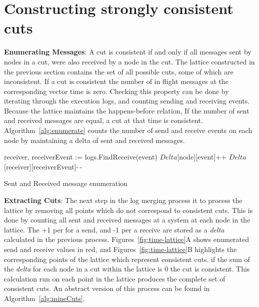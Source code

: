 \section{Constructing strongly consistent cuts}
\label{sec:consistent-cuts-appendix}

\textbf{Enumerating Messages}: A cut is consistent if and only if all
messages sent by nodes in a cut, were also received by a node in the
cut.  The lattice constructed in the previous section contains the set
of all possible cuts, some of which are inconsistent. If a cut is
consistent the number of in flight messages at the corresponding
vector time is zero. Checking this property can be done by iterating
through the execution logs, and counting sending and receiving events.
Because the lattice maintains the happens-before relation, If the
number of sent and received messages are equal, a cut at that time is
consistent.  Algorithm~\ref{alg:enumerate} counts the number of send
and receive events on each node by maintaining a delta of sent and
received messages.

\begin{algorithm}[t]
     {
         {
             {
                receiver, receiverEvent := logs.FindReceive(event)
                $Delta$[node][event]++
                $Delta$[receiver][receiverEvent]-\,-
            }
        }
    }
    \caption{Sent and Received message enumeration}
    \label{alg:enumerate}
\end{algorithm}


\textbf{Extracting Cuts}: The next step in the log merging process it
to process the lattice by removing all points which do not correspond
to consistent cuts.  This is done by counting all sent and received
messages at a system at each node in the lattice.  The +1 per for a
send, and -1 per a receive are stored as a \emph{delta} calculated in
the previous process. 
%
Figures~\ref{fig:time-lattice}A shows enumerated send and receive
values in red, and Figures~\ref{fig:time-lattice}B highlights the
corresponding points of the lattice which represent consistent cuts.
if the sum of the \emph{delta} for each node in a cut within the
lattice is $0$ the cut is consistent. This calculation run on each
point in the lattice produces the complete set of consistent cuts.  An
abstract version of this process can be found in
Algorithm~\ref{alg:mineCuts}.

